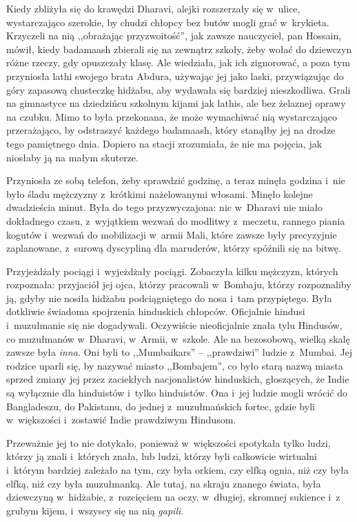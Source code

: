 \documentclass[oneside,polish,11pt,rmheadings]{mwbk}
\begin{document}
Kiedy zbliżyła się do krawędzi Dharavi, alejki rozszerzały się w~ulice, wystarczająco szerokie, by chudzi chłopcy bez butów mogli grać w~krykieta. Krzyczeli na nią ,,obrażając przyzwoitość'', jak zawsze nauczyciel, pan Hossain, mówił, kiedy badamaash zbierali się na zewnątrz szkoły, żeby wołać do dziewczyn różne rzeczy, gdy opuszczały klasę. Ale wiedziała, jak ich zignorować, a poza tym przyniosła lathi swojego brata Abdura, używając jej jako laski, przywiązując do góry zapasową chusteczkę hidżabu, aby wydawała się bardziej nieszkodliwa. Grali na gimnastyce na dziedzińcu szkolnym kijami jak lathis, ale bez żelaznej oprawy na czubku. Mimo to była przekonana, że może wymachiwać nią wystarczająco przerażająco, by odstraszyć każdego badamaash, który stanąłby jej na drodze tego pamiętnego dnia. Dopiero na stacji zrozumiała, że nie ma pojęcia, jak niosłaby ją na małym skuterze.

Przyniosła ze sobą telefon, żeby sprawdzić godzinę, a teraz minęła godzina i~nie było śladu mężczyzny z~krótkimi nażelowanymi włosami. Minęło kolejne dwadzieścia minut. Była do tego przyzwyczajona: nic w~Dharavi nie miało dokładnego czasu, z~wyjątkiem wezwań do modlitwy z~meczetu, rannego piania kogutów i~wezwań do mobilizacji w~armii Mali, które zawsze były precyzyjnie zaplanowane, z~surową dyscypliną dla maruderów, którzy spóźnili się na bitwę.


Przyjeżdżały pociągi i~wyjeżdżały pociągi. Zobaczyła kilku mężczyzn, których rozpoznała: przyjaciół jej ojca, którzy pracowali w~Bombaju, którzy rozpoznaliby ją, gdyby nie nosiła hidżabu podciągniętego do nosa i~tam przypiętego. Była dotkliwie świadoma spojrzenia hinduskich chłopców. Oficjalnie hindusi i~muzułmanie się nie dogadywali. Oczywiście nieoficjalnie znała tylu Hindusów, co muzułmanów w~Dharavi, w~Armii, w~szkole. Ale na bezosobową, wielką skalę zawsze była \textit{inna}. Oni byli to ,,Mumbaikars'' -- ,,prawdziwi'' ludzie z~Mumbai. Jej rodzice uparli się, by nazywać miasto ,,Bombajem'', co było starą nazwą miasta sprzed zmiany jej przez zaciekłych nacjonalistów hinduskich, głoszących, że Indie są wyłącznie dla hinduistów i~tylko hinduistów. Ona i~jej ludzie mogli wrócić do Bangladeszu, do Pakistanu, do jednej z~muzułmańskich fortec, gdzie byli w~większości i~zostawić Indie prawdziwym Hindusom.

Przeważnie jej to nie dotykało, ponieważ w~większości spotykała tylko ludzi, którzy ją znali i~których znała, lub ludzi, którzy byli całkowicie wirtualni i~którym bardziej zależało na tym, czy była orkiem, czy elfką ognia, niż czy była elfką, niż czy była muzułmanką. Ale tutaj, na skraju znanego świata, była dziewczyną w~hidżabie, z~rozcięciem na oczy, w~długiej, skromnej sukience i~z grubym kijem, i~wszyscy się na nią \textit{gapili}.
\end{document}
